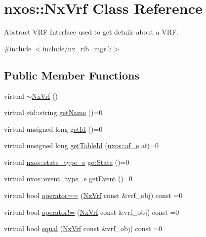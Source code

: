 \hypertarget{classnxos_1_1_nx_vrf}{}\section{nxos\+:\+:Nx\+Vrf Class Reference}
\label{classnxos_1_1_nx_vrf}


Abstract V\+RF Interface used to get details about a V\+RF.  




{\ttfamily \#include $<$include/nx\+\_\+rib\+\_\+mgr.\+h$>$}

\subsection*{Public Member Functions}
\begin{DoxyCompactItemize}
\item 
virtual \mbox{\hyperlink{classnxos_1_1_nx_vrf_ad5f50e3424b3d78304447600a3678e0b}{$\sim$\+Nx\+Vrf}} ()
\item 
virtual std\+::string \mbox{\hyperlink{classnxos_1_1_nx_vrf_a276a8d8170f372089a5653bdd7febfde}{get\+Name}} ()=0
\item 
virtual unsigned long \mbox{\hyperlink{classnxos_1_1_nx_vrf_a4ab30d5ff7a1d5d2abbab21652cd59fa}{get\+Id}} ()=0
\item 
virtual unsigned long \mbox{\hyperlink{classnxos_1_1_nx_vrf_a6f1529908decf0dfb531e674440d82ed}{get\+Table\+Id}} (\mbox{\hyperlink{nx__common_8h_a3a667f48b94db10aa398940dc5bf72d7}{nxos\+::af\+\_\+e}} af)=0
\item 
virtual \mbox{\hyperlink{nx__common_8h_a7c257059d03188765435b36e95dbb764}{nxos\+::state\+\_\+type\+\_\+e}} \mbox{\hyperlink{classnxos_1_1_nx_vrf_a443e508684e9804f14cc3526302ac8b4}{get\+State}} ()=0
\item 
virtual \mbox{\hyperlink{nx__common_8h_af9a9040b7681199d386e94eb888018cb}{nxos\+::event\+\_\+type\+\_\+e}} \mbox{\hyperlink{classnxos_1_1_nx_vrf_a42bdba27e42981d74066a72c24809c98}{get\+Event}} ()=0
\item 
virtual bool \mbox{\hyperlink{classnxos_1_1_nx_vrf_adc5d2e97b5fceb4fab75c448fb54ada5}{operator==}} (\mbox{\hyperlink{classnxos_1_1_nx_vrf}{Nx\+Vrf}} const \&vrf\+\_\+obj) const =0
\item 
virtual bool \mbox{\hyperlink{classnxos_1_1_nx_vrf_a2cc336534a1caff79ade7ed9b2a5a110}{operator!=}} (\mbox{\hyperlink{classnxos_1_1_nx_vrf}{Nx\+Vrf}} const \&vrf\+\_\+obj) const =0
\item 
virtual bool \mbox{\hyperlink{classnxos_1_1_nx_vrf_ade190af878a57a5f49a329fdffd6714e}{equal}} (\mbox{\hyperlink{classnxos_1_1_nx_vrf}{Nx\+Vrf}} const \&vrf\+\_\+obj) const =0
\end{DoxyCompactItemize}


